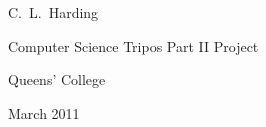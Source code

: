 \thispagestyle{empty}

\begin{flushright}
    C.~L.~Harding
\end{flushright}

\bigskip

\begingroup
    \thispagestyle{empty}
    \let\clearpage\relax
    \let\cleardoublepage\relax
    \let\cleardoublepage\relax
    \thispagestyle{empty}
    
    \vspace{12em}
    \vspace{4em}
    
    \large
    
    \noindent Computer Science Tripos Part II Project
    \vspace{1em}

    \noindent Queens' College
    \vspace{1em}
    
    \noindent March 2011
    \vspace{1em}
    
    \thispagestyle{empty}
\endgroup